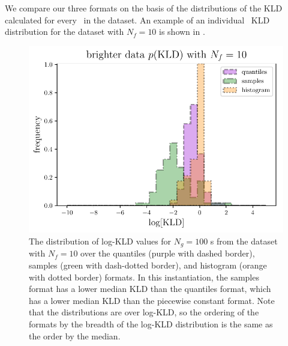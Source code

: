 We compare our three formats on the basis of the distributions of the KLD 
calculated for every \pz\ in the dataset.
An example of an individual \pz\ KLD distribution for the \mgdata dataset with 
$N_{f}=10$ is shown in .
\begin{figure}
	\begin{center}
		\includegraphics[width=\columnwidth]{figures/qp/individual_kld.pdf}
		\caption{The distribution of log-KLD values for $N_{g}=100$ \pz s from the 
			\mgdata dataset with $N_{f}=10$ over the quantiles (purple with dashed border), 
			samples (green with dash-dotted border), and histogram (orange with dotted 
			border) formats.
			In this instantiation, the samples format has a lower median KLD than the 
			quantiles format, which has a lower median KLD than the piecewise constant 
			format.
			Note that the distributions are over log-KLD, so the ordering of the 
			formats by the breadth of the log-KLD distribution is the same as the order by 
			the median.
			}
	\end{center}
\end{figure}

